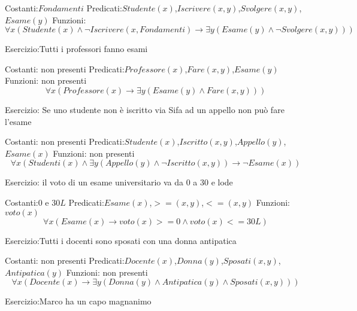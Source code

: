 Costanti:$Fondamenti$
Predicati:$Studente(x)$,$Iscrivere(x,y)$,$Svolgere(x,y)$,$Esame(y)$
Funzioni:
\begin{equation*}
\forall x (Studente(x) \land \neg Iscrivere(x,Fondamenti) \rightarrow
\exists y (Esame(y) \land \neg Svolgere(x,y)))
\end{equation*}

Esercizio:Tutti i professori fanno esami

Costanti: non presenti \newline
Predicati:$Professore(x)$,$Fare(x,y)$,$Esame(y)$ \newline
Funzioni: non presenti
\begin{equation*}
    \forall x (Professore(x) \rightarrow \exists y(Esame(y) \land Fare(x,y)))
\end{equation*}

Esercizio: Se uno studente non è iscritto via Sifa ad un appello non può fare l'esame

Costanti: non presenti \newline
Predicati:$Studente(x)$,$Iscritto(x,y)$,$Appello(y)$,$Esame(x)$ \newline
Funzioni: non presenti
\begin{equation*}
    \forall x (Studenti(x) \land \exists y(Appello(y) \land \neg Iscritto(x,y)) \rightarrow \neg Esame(x))
\end{equation*}

Esercizio: il voto di un esame universitario va da 0 a 30 e lode

Costanti:$0$ e $30L$ \newline
Predicati:$Esame(x)$,$>=(x,y)$,$<=(x,y)$ \newline
Funzioni:$voto(x)$
\begin{equation*}
    \forall x (Esame(x) \rightarrow voto(x) >= 0 \land voto(x) <= 30L)
\end{equation*}

Esercizio:Tutti i docenti sono sposati con una donna antipatica

Costanti: non presenti \newline
Predicati:$Docente(x)$,$Donna(y)$,$Sposati(x,y)$,$Antipatica(y)$ \newline
Funzioni: non presenti
\begin{equation*}
    \forall x (Docente(x) \rightarrow \exists y(Donna(y) \land Antipatica(y) \land Sposati(x,y)))
\end{equation*}

Esercizio:Marco ha un capo magnanimo

